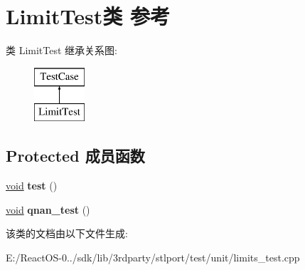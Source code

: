 \hypertarget{class_limit_test}{}\section{Limit\+Test类 参考}
\label{class_limit_test}
类 Limit\+Test 继承关系图\+:\begin{figure}[H]
\begin{center}
\leavevmode
\includegraphics[height=2.000000cm]{class_limit_test}
\end{center}
\end{figure}
\subsection*{Protected 成员函数}
\begin{DoxyCompactItemize}
\item 
\mbox{\label{class_limit_test_a2768247f8e3d9d5452ca2eb2aeff96ec}} 
\hyperlink{interfacevoid}{void} {\bfseries test} ()
\item 
\mbox{\label{class_limit_test_a659d6b4facd562d80eeb36c28bfaffa3}} 
\hyperlink{interfacevoid}{void} {\bfseries qnan\+\_\+test} ()
\end{DoxyCompactItemize}


该类的文档由以下文件生成\+:\begin{DoxyCompactItemize}
\item 
E\+:/\+React\+O\+S-\/0../sdk/lib/3rdparty/stlport/test/unit/limits\+\_\+test.\+cpp\end{DoxyCompactItemize}
